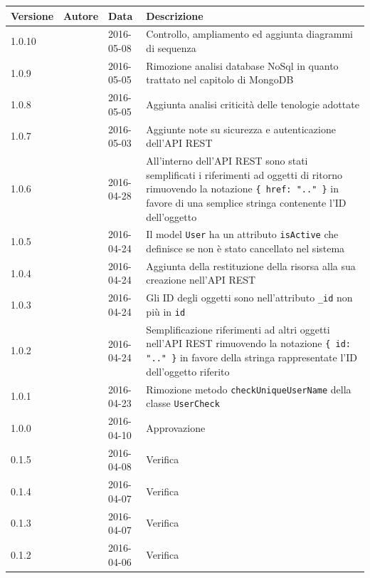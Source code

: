 \documentclass[12pt,a4paper]{article}
\begin{document}
\begin{center}
	\begin{longtable}[H]{p{} p{} p{} p{}}
		\toprule
		\textbf{Versione}	&	\textbf{Autore}	&	\textbf{Data}	&	\textbf{Descrizione}\\*
		\midrule
		\midrule
		1.0.10 & \TODO{} & 2016-05-08 & Controllo, ampliamento ed aggiunta diagrammi di sequenza \\*
		\midrule
		1.0.9 & \TODO{} & 2016-05-05 & Rimozione analisi database NoSql in quanto trattato nel capitolo di MongoDB \\*
		\midrule
		1.0.8 & \TODO{} & 2016-05-05 & Aggiunta analisi criticità delle tenologie adottate \\*
		\midrule
		1.0.7 & \TP{} & 2016-05-03 & Aggiunte note su sicurezza e autenticazione dell'API REST \\*
		\midrule
		1.0.6 & \TP{} & 2016-04-28 & All'interno dell'API REST sono stati semplificati i riferimenti ad oggetti di ritorno rimuovendo la notazione \texttt{\{ href: ".." \}} in favore di una semplice stringa contenente l'ID dell'oggetto \\*
		\midrule
		1.0.5 & \TP{} & 2016-04-24 & Il model \texttt{User} ha un attributo \texttt{isActive} che definisce se non è stato cancellato nel sistema \\*
		\midrule
		1.0.4 & \TP{} & 2016-04-24 & Aggiunta della restituzione della risorsa alla sua creazione nell'API REST \\*
		\midrule
		\midrule
		1.0.3 & \TP{} & 2016-04-24 & Gli ID degli oggetti sono nell'attributo \texttt{\_id} non più in \texttt{id} \\*
		\midrule
		1.0.2 & \TP{} & 2016-04-24 & Semplificazione riferimenti ad altri oggetti nell'API REST
			rimuovendo la notazione \texttt{\{ id: ".." \}} in favore della stringa rappresentate l'ID dell'oggetto
			riferito \\*
		\midrule
		1.0.1 & \TP{} & 2016-04-23 & Rimozione metodo \texttt{checkUniqueUserName} della classe
			\texttt{UserCheck} \\*
		\midrule
		1.0.0 & \TP{} & 2016-04-10 & Approvazione \\*
		\midrule
		0.1.5 & \NDC{} & 2016-04-08 & Verifica \\*
		\midrule
		0.1.4 & \WS{} & 2016-04-07 & Verifica \\*
		\midrule
		0.1.3 & \AVE{} & 2016-04-07 & Verifica \\*
		\midrule
		0.1.2 & \AVI{} & 2016-04-06 & Verifica \\*

\end{longtable}
\end{center}
\end{document}

